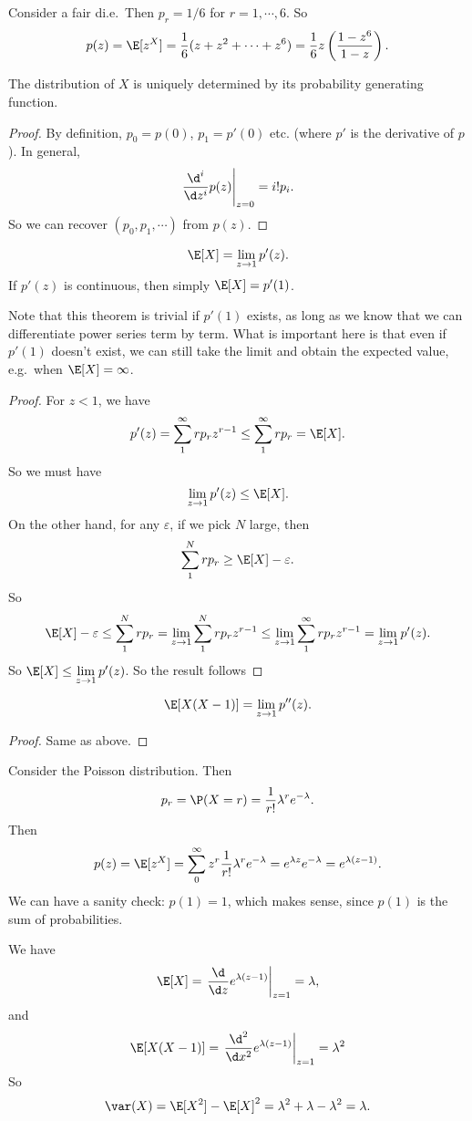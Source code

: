 \documentclass[a4paper]{article}
\begin{document}
\begin{eg}
  Consider a fair di.e.\ Then $p_r = 1/6$ for $r = 1, \cdots, 6$. So
  \[
    p(z) = \E[z^X] = \frac{1}{6}(z + z^2 + \cdots + z^6) = \frac{1}{6}z\left(\frac{1 - z^6}{1 - z}\right).
  \]
\end{eg}

\begin{thm}
  The distribution of $X$ is uniquely determined by its probability generating function.
\end{thm}

\begin{proof}
  By definition, $p_0 = p(0)$, $p_1 = p'(0)$ etc. (where $p'$ is the derivative of $p$). In general,
  \[
    \left. \frac{\d ^i}{\d z^i}p(z) \right|_{z = 0} = i! p_i.
  \]
  So we can recover $(p_0, p_1, \cdots)$ from $p(z)$.
\end{proof}

\begin{thm}
  \[
    \E[X] = \lim_{z\to 1}p'(z).
  \]
  If $p'(z)$ is continuous, then simply $\E[X] = p'(1)$.
\end{thm}
Note that this theorem is trivial if $p'(1)$ exists, as long as we know that we can differentiate power series term by term. What is important here is that even if $p'(1)$ doesn't exist, we can still take the limit and obtain the expected value, e.g.\ when $\E[X] = \infty$.

\begin{proof}
  For $z < 1$, we have
  \[
    p'(z) = \sum_1^\infty rp_r z^{r - 1} \leq \sum_1^\infty rp_r = \E[X].
  \]
  So we must have
  \[
    \lim_{z\to 1}p'(z) \leq \E[X].
  \]
  On the other hand, for any $\varepsilon$, if we pick $N$ large, then
  \[
    \sum_{1}^N rp_r \geq \E[X] - \varepsilon.
  \]
  So
  \[
    \E[X] - \varepsilon \leq \sum_1^N rp_r = \lim_{z\to 1}\sum _1^N rp_r z^{r - 1}\leq \lim_{z \to 1} \sum_1^\infty rp_r z^{r - 1} = \lim_{z\to 1} p' (z).
  \]
  So $\E[X] \leq \lim\limits_{z \to 1}p'(z)$. So the result follows
\end{proof}

\begin{thm}
  \[
    \E[X(X - 1)] = \lim_{z \to 1}p''(z).
  \]
\end{thm}
\begin{proof}
  Same as above.
\end{proof}

\begin{eg}
  Consider the Poisson distribution. Then
  \[
    p_r = \P(X = r) = \frac{1}{r!}\lambda^r e^{-\lambda}.
  \]
  Then
  \[
    p(z) = \E[z^X] = \sum_0^\infty z^r \frac{1}{r!}\lambda^r e^{-\lambda} = e^{\lambda z}e^{-\lambda} = e^{\lambda(z - 1)}.
  \]
  We can have a sanity check: $p(1) = 1$, which makes sense, since $p(1)$ is the sum of probabilities.

  We have
  \[
    \E[X]= \left.\frac{\d }{\d z}e^{\lambda(z - 1)}\right|_{z = 1} = \lambda,
  \]
  and
  \[
    \E[X(X - 1)] = \left.\frac{\d ^2}{\d x^2}e^{\lambda(z - 1)}\right|_{z = 1} = \lambda^2
  \]
  So
  \[
    \var(X) = \E[X^2] - \E[X]^2 = \lambda^2 + \lambda - \lambda^2 = \lambda.
  \]
\end{eg}
\end{document}

